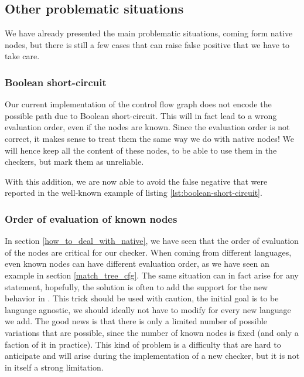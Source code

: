\subsection{Other problematic situations}
\label{subsec:other_problematic_situation}
	
We have already presented the main problematic situations, coming form native nodes, but there is still a few cases that can raise false positive that we have to take care.

\subsubsection{Boolean short-circuit}
\label{subsubsec:boolean_short_circuit}

Our current implementation of the control flow graph does not encode the possible path due to Boolean short-circuit. 
This will in fact lead to a wrong evaluation order, even if the nodes are known. 
Since the evaluation order is not correct, it makes sense to treat them the same way we do with native nodes! 
We will hence keep all the content of these nodes, to be able to use them in the checkers, but mark them as unreliable. 



With this addition, we are now able to avoid the false negative that were reported in the well-known example of listing \ref{lst:boolean-short-circuit}.

\subsubsection{Order of evaluation of known nodes}
\label{subsubsec:evaluation_known_nodes}

In section \ref{how_to_deal_with_native}, we have seen that the order of evaluation of the nodes are critical for our checker.
When coming from different languages, even known nodes can have different evaluation order, as we have seen an example in section \ref{match_tree_cfg}. 
The same situation can in fact arise for any statement, hopefully, the solution is often to add the support for the new behavior in \slang{}.
This trick should be used with caution, the initial goal is to be language agnostic, we should ideally not have to modify \slang{} for every new language we add. The good news is that there is only a limited number of possible variations that are possible, since the number of known nodes is fixed (and only a faction of it in practice). 
This kind of problem is a difficulty that are hard to anticipate and will arise during the implementation of a new checker, but it is not in itself a strong limitation.

